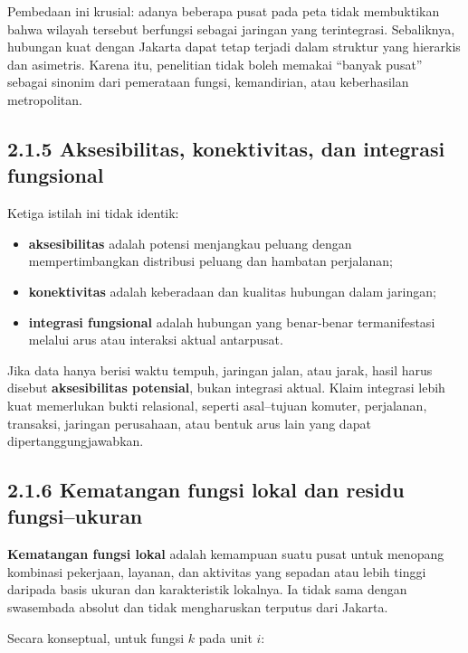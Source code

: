 \documentclass[
  indonesian,
  11pt,
  a4paper,
  oneside,
  openany]{report}
\providecommand{\tightlist}{%
  \setlength{\itemsep}{0pt}\setlength{\parskip}{0pt}}
\begin{document}
Pembedaan ini krusial: adanya beberapa pusat pada peta tidak membuktikan
bahwa wilayah tersebut berfungsi sebagai jaringan yang terintegrasi.
Sebaliknya, hubungan kuat dengan Jakarta dapat tetap terjadi dalam
struktur yang hierarkis dan asimetris. Karena itu, penelitian tidak
boleh memakai ``banyak pusat'' sebagai sinonim dari pemerataan fungsi,
kemandirian, atau keberhasilan metropolitan.

\subsection{2.1.5 Aksesibilitas, konektivitas, dan integrasi
fungsional}\label{aksesibilitas-konektivitas-dan-integrasi-fungsional}

Ketiga istilah ini tidak identik:

\begin{itemize}
\tightlist
\item
  \textbf{aksesibilitas} adalah potensi menjangkau peluang dengan
  mempertimbangkan distribusi peluang dan hambatan perjalanan;
\item
  \textbf{konektivitas} adalah keberadaan dan kualitas hubungan dalam
  jaringan;
\item
  \textbf{integrasi fungsional} adalah hubungan yang benar-benar
  termanifestasi melalui arus atau interaksi aktual antarpusat.
\end{itemize}

Jika data hanya berisi waktu tempuh, jaringan jalan, atau jarak, hasil
harus disebut \textbf{aksesibilitas potensial}, bukan integrasi aktual.
Klaim integrasi lebih kuat memerlukan bukti relasional, seperti
asal--tujuan komuter, perjalanan, transaksi, jaringan perusahaan, atau
bentuk arus lain yang dapat dipertanggungjawabkan.

\subsection{2.1.6 Kematangan fungsi lokal dan residu
fungsi--ukuran}\label{kematangan-fungsi-lokal-dan-residu-fungsiukuran}

\textbf{Kematangan fungsi lokal} adalah kemampuan suatu pusat untuk
menopang kombinasi pekerjaan, layanan, dan aktivitas yang sepadan atau
lebih tinggi daripada basis ukuran dan karakteristik lokalnya. Ia tidak
sama dengan swasembada absolut dan tidak mengharuskan terputus dari
Jakarta.

Secara konseptual, untuk fungsi \(k\) pada unit \(i\):
\end{document}
